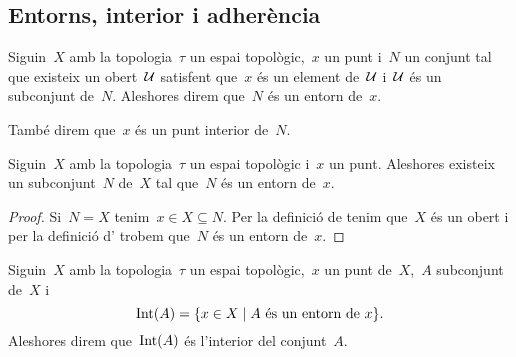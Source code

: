 \documentclass[../../main.tex]{subfiles}
\begin{document}
    \subsection{Entorns, interior i adherència}
    \begin{definition}[Entorn]
        \label{def:entorn}
        \label{def:punt interior}
        Siguin~\(X\) amb la topologia~\(\tau\) un espai topològic,~\(x\) un punt i~\(N\) un conjunt tal que existeix un obert~\(\mathcal{U}\) satisfent que~\(x\) és un element de~\(\mathcal{U}\) i~\(\mathcal{U}\) és un subconjunt de~\(N\).
        Aleshores direm que~\(N\) és un entorn de~\(x\).

        També direm que~\(x\) és un punt interior de~\(N\).
    \end{definition}
    \begin{observation}
        \label{obs:tot punt té un entorn}
        Siguin~\(X\) amb la topologia~\(\tau\) un espai topològic i~\(x\) un punt.
        Aleshores existeix un subconjunt~\(N\) de~\(X\) tal que~\(N\) és un entorn de~\(x\).
        \begin{proof}
            Si~\(N=X\) tenim~\(x\in X\subseteq N\).
            Per la definició de  tenim que~\(X\) és un obert i per la definició d' trobem que~\(N\) és un entorn de~\(x\).
        \end{proof}
    \end{observation}
    \begin{definition}[Interior]
        \label{def:interior}
        Siguin~\(X\) amb la topologia~\(\tau\) un espai topològic,~\(x\) un punt de~\(X\),~\(A\) subconjunt de~\(X\) i
        \[
            \operatorname{Int}(A)=\{x\in X\mid A\text{ és un entorn de }x\}.
        \]
        Aleshores direm que~\(\operatorname{Int}(A)\) és l'interior del conjunt~\(A\).
    \end{definition}
\end{document}
